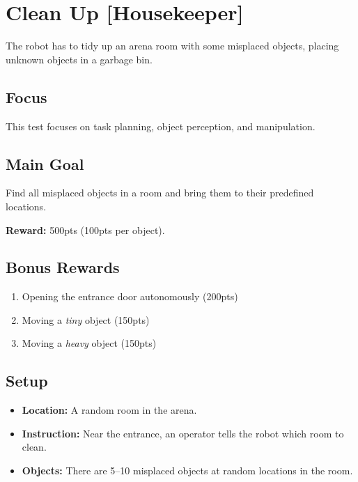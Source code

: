 \section{Clean Up [Housekeeper]}
\label{test:clean-up}

The robot has to tidy up an arena room with some misplaced objects, placing unknown objects in a garbage bin.

\subsection*{Focus}
This test focuses on task planning, object perception, and manipulation.

\subsection*{Main Goal}
Find all misplaced objects in a room and bring them to their predefined locations.

\noindent\textbf{Reward:} 500pts (100pts per object).

\subsection*{Bonus Rewards}
\begin{enumerate}[nosep]
	\item Opening the entrance door autonomously (200pts)
	\item Moving a \emph{tiny} object (150pts)
	\item Moving a \emph{heavy} object (150pts)
\end{enumerate}


\subsection*{Setup}
\begin{itemize}[nosep]
	\item \textbf{Location:} A random room in the arena.
	\item \textbf{Instruction:} Near the entrance, an operator tells the robot which room to clean.
	\item \textbf{Objects:} There are 5--10 misplaced objects at random locations in the room.
\end{itemize}

